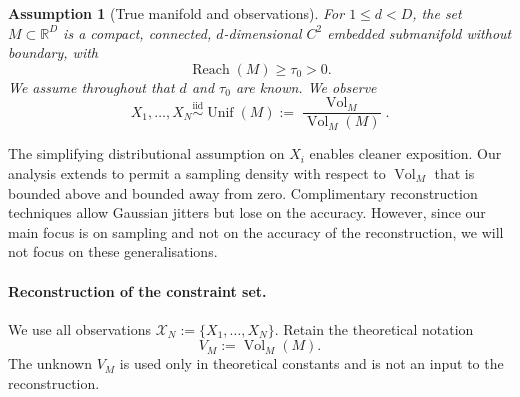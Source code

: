 \documentclass{article}
\newtheorem{assumption}{Assumption}
\newcommand{\R}{\mathbb R}
\newcommand{\Vol}{\operatorname{Vol}}
\newcommand{\Reach}{\operatorname{Reach}}
\numberwithin{equation}{section}
\begin{document}
\begin{assumption}[True manifold and observations]
\label{ass:true-manifold}
For $1\le d<D$, the set $M\subset\R^D$ is a compact, connected,
$d$-dimensional $C^2$ embedded submanifold without boundary, with
\[
  \Reach(M)\ge\tau_0>0.
\]
We assume throughout that $d$ and $\tau_0$ are known. We observe
\[
  X_1,\ldots,X_N\overset{\mathrm{iid}}{\sim}
  \operatorname{Unif}(M)
  :=\frac{\Vol_M}{\Vol_M(M)}.
\]
\end{assumption}
The simplifying distributional assumption on $X_i$ enables cleaner exposition. Our analysis extends to permit a sampling density with respect to $\Vol_M$ that is bounded above and bounded away from zero. Complimentary reconstruction techniques \citep{fefferman2019} allow Gaussian jitters but lose on the accuracy. However, since our main focus is on sampling and not on the accuracy of the reconstruction, we will not focus on these generalisations.

\paragraph{Reconstruction of the constraint set.}
We use all observations $\mathcal X_N:=\{X_1,\ldots,X_N\}$. Retain the
theoretical notation
\begin{equation}
 V_M:=\Vol_M(M).
\label{eq:volume-def}
\end{equation}
The unknown $V_M$ is used only in theoretical constants and is not an input
to the reconstruction.
\end{document}
